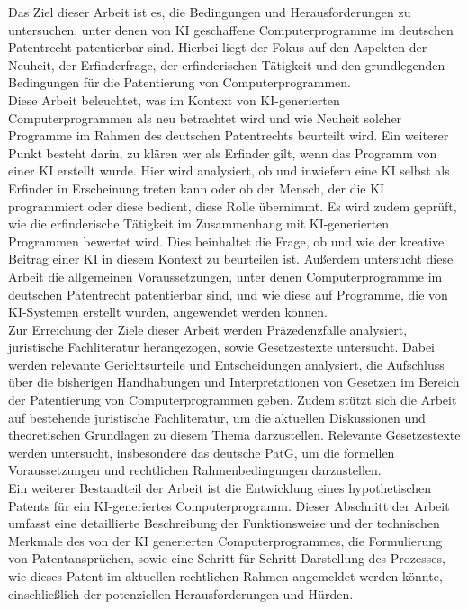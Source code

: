 Das Ziel dieser Arbeit ist es, 
die Bedingungen und Herausforderungen zu untersuchen,
unter denen von KI geschaffene Computerprogramme im deutschen Patentrecht 
patentierbar sind. Hierbei liegt der Fokus auf den Aspekten der Neuheit, 
der Erfinderfrage, der erfinderischen Tätigkeit 
und den grundlegenden Bedingungen für die Patentierung von Computerprogrammen. 
\\

Diese Arbeit beleuchtet, 
was im Kontext von KI-generierten Computerprogrammen 
als neu betrachtet wird 
und wie Neuheit solcher Programme 
im Rahmen des deutschen Patentrechts beurteilt wird. 
Ein weiterer Punkt besteht darin, zu klären 
wer als Erfinder gilt,
wenn das Programm von einer KI erstellt wurde. 
Hier wird analysiert, 
ob und inwiefern eine KI selbst als Erfinder in Erscheinung treten kann 
oder ob der Mensch, der die KI programmiert oder diese bedient, 
diese Rolle übernimmt. 
Es wird zudem geprüft, 
wie die erfinderische Tätigkeit im Zusammenhang 
mit KI-generierten Programmen bewertet wird. 
Dies beinhaltet die Frage, 
ob und wie der kreative Beitrag einer KI in diesem Kontext zu beurteilen ist. 
Außerdem untersucht diese Arbeit die allgemeinen Voraussetzungen, 
unter denen Computerprogramme im deutschen Patentrecht patentierbar sind, 
und wie diese auf Programme, 
die von KI-Systemen erstellt wurden, angewendet werden können. 
\\

Zur Erreichung der Ziele dieser Arbeit werden Präzedenzfälle analysiert, 
juristische Fachliteratur herangezogen, sowie Gesetzestexte untersucht. 
Dabei werden relevante Gerichtsurteile und Entscheidungen analysiert, 
die Aufschluss über die bisherigen Handhabungen 
und Interpretationen 
von Gesetzen im Bereich der Patentierung von Computerprogrammen geben. 
Zudem stützt sich die Arbeit auf bestehende juristische Fachliteratur, 
um die aktuellen Diskussionen 
und theoretischen Grundlagen zu diesem Thema darzustellen.
Relevante Gesetzestexte werden untersucht, insbesondere das deutsche PatG, 
um die formellen Voraussetzungen und rechtlichen Rahmenbedingungen darzustellen. 
\\

Ein weiterer Bestandteil der Arbeit ist die Entwicklung eines hypothetischen Patents 
für ein KI-generiertes Computerprogramm. 
Dieser Abschnitt der Arbeit umfasst eine detaillierte Beschreibung der Funktionsweise 
und der technischen Merkmale des von der KI generierten Computerprogrammes, 
die Formulierung von Patentansprüchen, 
sowie eine Schritt-für-Schritt-Darstellung des Prozesses, 
wie dieses Patent im aktuellen rechtlichen Rahmen angemeldet werden könnte, 
einschließlich der potenziellen Herausforderungen und Hürden. 
\\

